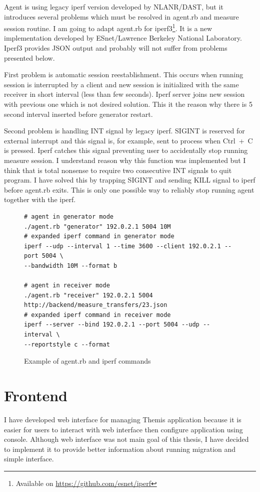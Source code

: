 Agent is using legacy iperf version developed by NLANR/DAST, but it introduces several problems which must be resolved in agent.rb and measure session routine. I am going to adapt agent.rb for iperf3\footnote{Available on \url{https://github.com/esnet/iperf}}. It is a new implementation developed by ESnet/Lawrence Berkeley National Laboratory. Iperf3 provides \Ac{JSON} output and probably will not suffer from problems presented below.

First problem is automatic session reestablishment. This occurs when running session is interrupted by a client and new session is initialized with the same receiver in short interval (less than few seconds). Iperf server joins new session with previous one which is not desired solution. This it the reason why there is 5 second interval inserted before generator restart. 

Second problem is handling INT signal by legacy iperf. SIGINT is reserved for external interrupt and this signal is, for example, sent to process when \mbox{Ctrl + C} is pressed. Iperf catches this signal preventing user to accidentally stop running measure session. I understand reason why this function was implemented but I think that is total nonsense to require two consecutive INT signals to quit program. I have solved this by trapping SIGINT and sending KILL signal to iperf before agent.rb exits. This is only one possible way to reliably stop running agent together with the iperf.

\begin{figure}[htb]
\caption{Example of agent.rb and iperf commands}
\label{code:fw}
\begin{verbatim}
# agent in generator mode
./agent.rb "generator" 192.0.2.1 5004 10M
# expanded iperf command in generator mode
iperf --udp --interval 1 --time 3600 --client 192.0.2.1 --port 5004 \
--bandwidth 10M --format b
	
# agent in receiver mode
./agent.rb "receiver" 192.0.2.1 5004 http://backend/measure_transfers/23.json
# expanded iperf command in receiver mode
iperf --server --bind 192.0.2.1 --port 5004 --udp --interval \
--reportstyle c --format
\end{verbatim}
\end{figure}



\section{Frontend}
I have developed web interface for managing Themis application because it is easier for users to interact with web interface then configure application using console. Although web interface was not main goal of this thesis, I have decided to implement it to provide better information about running migration and simple interface.

